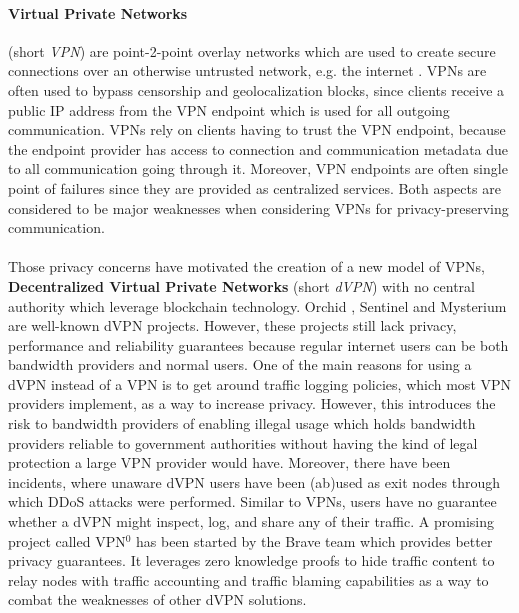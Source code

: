 \paragraph{Virtual Private Networks} (short \textit{VPN}) are point-2-point
overlay networks which are used to create secure connections over an otherwise
untrusted network, e.g. the internet \cite{venkateswaran_2001}. VPNs are often
used to bypass censorship \cite{hobbs_roberts_2018} and geolocalization blocks,
since clients receive a public IP address from the VPN endpoint which is used
for all outgoing communication. VPNs rely on clients having to trust the VPN
endpoint, because the endpoint provider has access to connection and
communication metadata due to all communication going through it. Moreover, VPN
endpoints are often single point of failures since they are provided as
centralized services. Both aspects are considered to be major weaknesses when
considering VPNs for privacy-preserving communication.
\\~\\Those privacy concerns have motivated the creation of a new model of VPNs,
\textbf{Decentralized Virtual Private Networks} (short \textit{dVPN}) with no
central authority which leverage blockchain technology. Orchid \cite{orchid},
Sentinel \cite{sentinel} and Mysterium \cite{mysterium} are well-known dVPN
projects. However, these projects still lack privacy, performance and
reliability guarantees because regular internet users can be both bandwidth
providers and normal users. One of the main reasons for using a dVPN instead of
a VPN is to get around traffic logging policies, which most VPN providers
implement, as a way to increase privacy. However, this introduces the risk to
bandwidth providers of enabling illegal usage which holds bandwidth providers
reliable to government authorities without having the kind of legal protection a
large VPN provider would have. Moreover, there have been incidents, where
unaware dVPN users have been (ab)used as exit nodes through which DDoS attacks
were performed. Similar to VPNs, users have no guarantee whether a dVPN might
inspect, log, and share any of their traffic. A promising project called VPN$^0$
\cite{vpn0} has been started by the Brave team which provides better privacy
guarantees. It leverages zero knowledge proofs to hide traffic content to relay
nodes with traffic accounting and traffic blaming capabilities as a way to
combat the weaknesses of other dVPN solutions.

